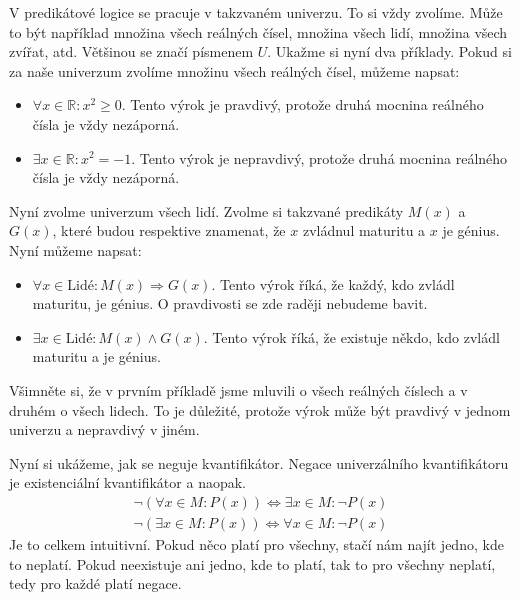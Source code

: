 \begin{example}
  V predikátové logice se pracuje v takzvaném univerzu. To si vždy zvolíme. Může to být například množina všech reálných čísel, množina všech lidí, množina všech zvířat, atd. Většinou se značí písmenem $U$. Ukažme si nyní dva příklady. Pokud si za naše univerzum zvolíme množinu všech reálných čísel, můžeme napsat:
  \begin{itemize}
    \item $\forall x \in \mathbb{R}: x^2 \geq 0$. Tento výrok je pravdivý, protože druhá mocnina reálného čísla je vždy nezáporná.
    \item $\exists x \in \mathbb{R}: x^2 = -1$. Tento výrok je nepravdivý, protože druhá mocnina reálného čísla je vždy nezáporná.  
  \end{itemize}
  Nyní zvolme univerzum všech lidí. Zvolme si takzvané predikáty $M(x)$ a $G(x)$, které budou respektive znamenat, že $x$ zvládnul maturitu a $x$ je génius. Nyní můžeme napsat:
  \begin{itemize}
    \item $\forall x \in \text{Lidé}: M(x) \Rightarrow G(x)$. Tento výrok říká, že každý, kdo zvládl maturitu, je génius. O pravdivosti se zde raději nebudeme bavit.
    \item $\exists x \in \text{Lidé}: M(x) \land G(x)$. Tento výrok říká, že existuje někdo, kdo zvládl maturitu a je génius.
  \end{itemize}

  Všimněte si, že v prvním příkladě jsme mluvili o všech reálných číslech a v druhém o všech lidech. To je důležité, protože výrok může být pravdivý v jednom univerzu a nepravdivý v jiném.

  \begin{definitionbox}
    Nyní si ukážeme, jak se neguje kvantifikátor. Negace univerzálního kvantifikátoru je existenciální kvantifikátor a naopak.
  \begin{equation}
    \begin{aligned}
      \neg (\forall x \in M: P(x)) \Leftrightarrow \exists x \in M: \neg P(x) \\
      \neg (\exists x \in M: P(x)) \Leftrightarrow \forall x \in M: \neg P(x)  
    \end{aligned}
  \end{equation}
  Je to celkem intuitivní. Pokud něco platí pro všechny, stačí nám najít jedno, kde to neplatí. Pokud neexistuje ani jedno, kde to platí, tak to pro všechny neplatí, tedy pro každé platí negace.
  \end{definitionbox}
\end{example}

